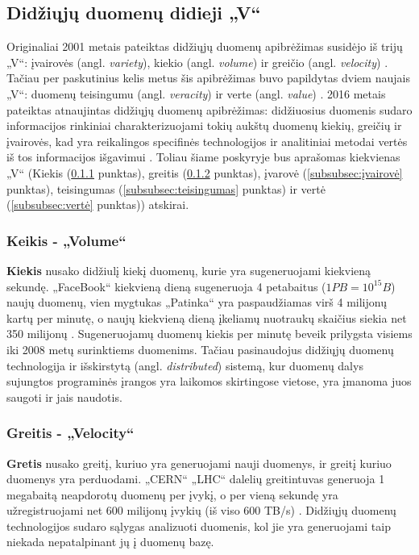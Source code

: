 \documentclass{VUMIFPSkursinis}
\begin{document}
\subsection{Didžiųjų duomenų didieji „V“} \label{subsec:požymiai}
Originaliai 2001 metais pateiktas didžiųjų duomenų apibrėžimas susidėjo iš trijų „V“: įvairovės (angl. \textit{variety}), kiekio (angl. \textit{volume}) ir greičio (angl. \textit{velocity}) \cite{three_vs}. Tačiau per paskutinius kelis metus šis apibrėžimas buvo papildytas dviem naujais „V“: duomenų teisingumu (angl. \textit{veracity}) ir verte (angl. \textit{value}) \cite{five_vs_everyone_must_know}. 2016 metais pateiktas atnaujintas didžiųjų duomenų apibrėžimas: didžiuosius duomenis sudaro informacijos rinkiniai charakterizuojami tokių aukštų duomenų kiekių, greičių ir įvairovės, kad yra reikalingos specifinės technologijos ir analitiniai metodai vertės iš tos informacijos išgavimui \cite{bigdata_16}. Toliau šiame poskyryje bus aprašomas kiekvienas „V“ (Kiekis (\ref{subsubsec:kiekis} punktas), greitis (\ref{subsubsec:greitis} punktas), įvarovė (\ref{subsubsec:įvairovė} punktas), teisingumas (\ref{subsubsec:teisingumas} punktas) ir vertė (\ref{subsubsec:vertė} punktas)) atskirai.

\subsubsection{Keikis - „Volume“} \label{subsubsec:kiekis}
\textbf{Kiekis} nusako didžiulį kiekį duomenų, kurie yra sugeneruojami kiekvieną sekundę. „FaceBook“ kiekvieną dieną sugeneruoja 4 petabaitus ($1 PB = {10}^{15} B$) naujų duomenų, vien mygtukas „Patinka“ yra paspaudžiamas virš 4 milijonų kartų per minutę, o naujų kiekvieną dieną įkeliamų nuotraukų skaičius siekia net 350 milijonų \cite{facebook_stats}. Sugeneruojamų duomenų kiekis per minutę beveik prilygsta visiems iki 2008 metų surinktiems duomenims. Tačiau pasinaudojus didžiųjų duomenų technologija ir išskirstytą (angl. \textit{distributed}) sistemą, kur duomenų dalys sujungtos programinės įrangos yra laikomos skirtingose vietose, yra įmanoma juos saugoti ir jais naudotis.

\subsubsection{Greitis - „Velocity“} \label{subsubsec:greitis}
\textbf{Gretis} nusako greitį, kuriuo yra generuojami nauji duomenys, ir greitį kuriuo duomenys yra perduodami. „CERN“ „LHC“ dalelių greitintuvas generuoja 1 megabaitą neapdorotų duomenų per įvykį, o per vieną sekundę yra užregistruojami net 600 milijonų įvykių (iš viso 600 TB/s) \cite{cern}. Didžiųjų duomenų technologijos sudaro sąlygas analizuoti duomenis, kol jie yra generuojami taip niekada nepatalpinant jų į duomenų bazę.
\end{document}
